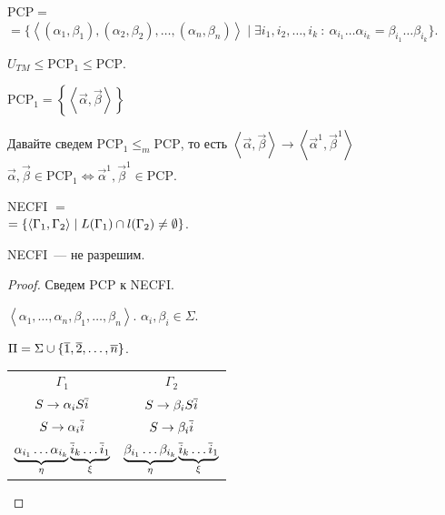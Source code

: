 \begin{problem}

    $\mathrm{PCP} =$\\
    $ = \{ \left< (\alpha_1, \beta_1), (\alpha_2, \beta_2), \dots, (\alpha_n, \beta_n) \right> \mid \exists i_1, i_2, \dots, i_k ~:~  \alpha_{i_1} \dots\alpha_{i_k} = \beta_{i_1}\dots\beta_{i_k} \}$.

    $U_{TM} \leqslant \mathrm{PCP}_1 \leqslant \mathrm{PCP}$.

    $\mathrm{PCP}_1 =\left\{ \left< \overset{\to}\alpha, \overset{\to}\beta \right> \right\} $

\begin{lemma}
        Давайте сведем $\mathrm{PCP}_1 \leqslant_m \mathrm{PCP}$, то есть $\left< \overset{\to}\alpha, \overset{\to}\beta \right> \to \left< \overset{\to}\alpha^1, \overset{\to}\beta^1 \right>$ \\ $\overset{\to}\alpha, \overset{\to}\beta \in \mathrm{PCP}_1 \iff \overset{\to}\alpha^1, \overset{\to}\beta^1 \in \mathrm{PCP}$.
    \end{lemma}
\end{problem}

\begin{problem}

    NECFI $=$\\$ = \{ \left< \Gamma_1, \Gamma_2 \right> \mid L(\Gamma_1) \cap l(\Gamma_2) \neq \emptyset \}$.

    NECFI~--- не разрешим.
\end{problem}
\begin{proof}
    Сведем PCP к NECFI.

    $\left< \alpha_1, \dots, \alpha_n, \beta_1, \dots, \beta_n \right>$.
    $\alpha_i, \beta_i \in \Sigma$.

    $\Pi = \Sigma \cup \{ \overline{1}, \overline{2}, \dots, \overline{n} \}$.

    \begin{tabular}{c | c}
        $\Gamma_1$ & $\Gamma_2$\\
        $S \to \alpha_i S \overline{i}$ & $S \to \beta_i S \overline{i}$\\
        $S \to \alpha_i \overline{i}$ & $S \to \beta_i \overline{i}$\\
        $\underbrace{\alpha_{i_1} \dots \alpha_{i_k}}_\eta \underbrace{\overline{i}_k \dots \overline{i}_1}_{\xi}$ &
        $\underbrace{\beta_{i_1} \dots \beta_{i_k}}_\eta \underbrace{\overline{i}_k \dots \overline{i}_1}_{\xi}$
    \end{tabular}
\end{proof}

